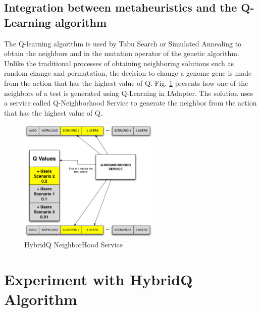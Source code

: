 \documentclass{report}
\begin{document}
\subsection{Integration between metaheuristics and the Q-Learning algorithm }

The Q-learning algorithm is used by Tabu Search or Simulated Annealing to obtain the neighbors and in the mutation operator of the genetic algorithm. Unlike the traditional processes of obtaining neighboring solutions such as random change and permutation, the decision to change a genome gene is made from the action that has the highest value of Q. Fig. \ref{fig:neighservice} presents how one of the neighbors of a test is generated using Q-Learning in IAdapter. The solution uses a service called Q-Neighborhood Service to generate the neighbor from the action that has the highest value of Q.

\begin{figure}[h!]
\center
\includegraphics[width=0.6\textwidth]{./images/q-neighborservice.png}
\caption{HybridQ NeighborHood Service}
\label{fig:neighservice}
\end{figure}

\section{Experiment with HybridQ Algorithm}
\end{document}

